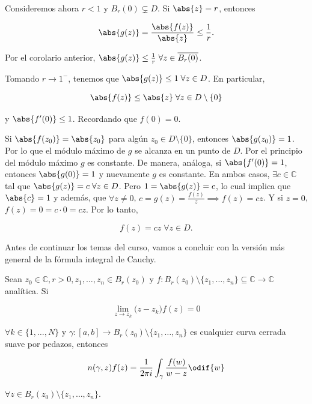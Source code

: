 \documentclass[../main.tex]{subfiles}
\begin{document}
Consideremos ahora \(r < 1\) y \(B_{r}(0) \subsetneq D\). Si \( \abs{z} = r\), entonces

\begin{equation*}
    \abs{g(z)} = \dfrac{\abs{f(z)}}{\abs{z}} \leq \dfrac{1}{r}.
\end{equation*}

Por el corolario anterior, \(\abs{g(z)} \leq \tfrac{1}{r}\; \forall z\in
\overline{B_{r}(0)}\).

Tomando \( r \to 1^{-}\), tenemos que \(\abs{g(z)} \leq 1\; \forall z\in D\). En
particular,

\begin{equation*}
    \abs{f(z)} \leq \abs{z}\; \forall z\in D\setminus \{0\}
\end{equation*}

y \(\abs{f^{\prime}(0)} \leq 1\). Recordando que \(f(0) = 0\).

Si \(\abs{f(z_{0})} = \abs{z_{0}}\) para algún \(z_{0}\in  D\setminus \{0\}\), entonces
\(\abs{g(z_{0})} = 1\). Por lo que el módulo máximo de \(g\) se alcanza en un punto de
\(D\). Por el principio del módulo máximo \(g\) es constante. De manera, análoga, si
\(\abs{f^{\prime}(0)} = 1\), entonces \(\abs{g(0)} = 1\) y nuevamente \(g\) es
constante. En ambos casos, \(\exists c\in \mathbb{C}\) tal que \(\abs{g(z)} = c\;
\forall z\in D\). Pero \(1 = \abs{g(z)} = c\), lo cual implica que \(\abs{c} = 1\) y
además, que \(\forall z \neq 0\), \(c = g(z) = \tfrac{f(z)}{z} \implies f(z) = cz\). Y
si \(z = 0\), \(f(z) = 0 = c \cdot 0 = cz\). Por lo tanto,

\begin{equation*}
    f(z) = cz\; \forall z\in D.
\end{equation*}


Antes de continuar los temas del curso, vamos a concluir con la versión más general de
la fórmula integral de Cauchy.

\begin{theorem}
    Sean \(z_{0}\in  \mathbb{C}, r > 0, z_{1},\dots, z_{n}\in B_{r}(z_{0})\) y \(f
        \colon B_{r}(z_{0})\setminus \bigl\lbrace z_{1},\dots,z_{n}
        \bigr\rbrace \subseteq
    \mathbb{C} \to \mathbb{C}\) analítica. Si

    \begin{equation*}
        \lim_{z \to z_{k}} \bigl(z - z_{k}\bigr)f(z) = 0
    \end{equation*}

    \(\forall k\in \bigl\lbrace 1,\dots,N \bigr\rbrace\) y \(\gamma \colon [a, b] \to
    B_{r}(z_{0})\setminus \bigl\lbrace z_{1},\dots,z_{n} \bigr\rbrace\) es
    cualquier curva
    cerrada suave por pedazos, entonces

    \begin{equation*}
        n(\gamma, z)f(z) = \dfrac{1}{2\pi i}\int_{\gamma}^{}\dfrac{f(w)}{w - z}\odif{w}
    \end{equation*}

    \(\forall z\in B_{r}(z_{0})\setminus \bigl\lbrace z_{1},\dots,z_{n} \bigr\rbrace\).
\end{theorem}
\end{document}
